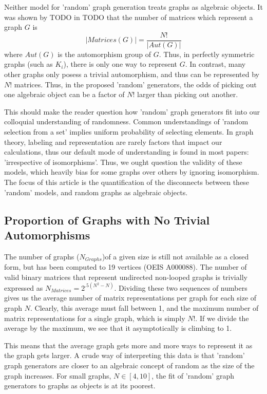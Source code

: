 \documentclass[a4paper,12pt]{article}
\begin{document}
Neither model for 'random' graph generation treats graphs as algebraic objects.
It was shown by TODO in TODO that the number of matrices which represent a graph \(G\) is
\[| Matrices(G) | = \frac{N!}{| Aut(G) |}\]
where \(Aut(G)\) is the automorphism group of \(G\).
Thus, in perfectly symmetric graphs (such as \(K_i\)), there is only one way to represent \(G\).
In contrast, many other graphs only posess a trivial automorphism, and thus can be represented by \(N!\) matrices.
Thus, in the proposed 'random' generators, the odds of picking out one algebraic object can be a factor of \(N!\) larger than picking out another. 

This should make the reader question how 'random' graph generators fit into our colloquial understanding of randomness.
Common understandings of 'random selection from a set' implies uniform probability of selecting elements.
In graph theory, labeling and representation are rarely factors that impact our calculations, thus our default mode of understanding is found in most papers: 'irrespective of isomorphisms'.
Thus, we ought question the validity of these models, which heavily bias for some graphs over others by ignoring isomorphism.
The focus of this article is the quantification of the disconnects between these 'random' models, and random graphs as algebraic objects.

\subsection*{Proportion of Graphs with No Trivial Automorphisms}

The number of graphs (\(N_{Graphs}\))of a given size is still not available as a closed form, but has been computed to 19 vertices (OEIS A000088).
The number of valid binary matrices that represent undirected non-looped graphs is trivially expressed as \(N_{Matrices} = 2^{.5(N^2 - N)}\).
Dividing these two sequences of numbers gives us the average number of matrix representations per graph for each size of graph \(N\).
Clearly, this average must fall between 1, and the maximum number of matrix representations for a single graph, which is simply \(N!\).
If we divide the average by the maximum, we see that it asymptotically is climbing to 1.

This means that the average graph gets more and more ways to represent it as the graph gets larger.
A crude way of interpreting this data is that 'random' graph generators are closer to an algebraic concept of random as the size of the graph increases.
For small graphs, \(N \in [4, 10]\), the fit of 'random' graph generators to graphs as objects is at its poorest.
\end{document}
